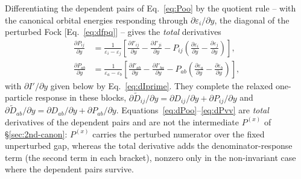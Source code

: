 \documentclass[12pt]{article}
\begin{document}
\noindent
Differentiating the dependent pairs of Eq.~\eqref{eq:Poo} by the quotient rule --
with the canonical orbital energies responding through
$\partial\varepsilon_i/\partial y$, the diagonal of the perturbed Fock
[Eq.~\eqref{eq:dfpq}] -- gives the {\em total} derivatives
\begin{align}
\frac{\partial P_{ij}}{\partial y}
&= \frac{1}{\varepsilon_i-\varepsilon_j}\left[
\frac{\partial I'_{ij}}{\partial y}-\frac{\partial I'_{ji}}{\partial y}
- P_{ij}\left(\frac{\partial\varepsilon_i}{\partial y}
             -\frac{\partial\varepsilon_j}{\partial y}\right)\right],
\label{eq:dPoo}\\
\frac{\partial P_{ab}}{\partial y}
&= \frac{1}{\varepsilon_a-\varepsilon_b}\left[
\frac{\partial I'_{ab}}{\partial y}-\frac{\partial I'_{ba}}{\partial y}
- P_{ab}\left(\frac{\partial\varepsilon_a}{\partial y}
             -\frac{\partial\varepsilon_b}{\partial y}\right)\right],
\label{eq:dPvv}
\end{align}
with $\partial I'/\partial y$ given below by Eq.~\eqref{eq:dIprime}.  They complete
the relaxed one-particle response in these blocks,
$\partial\tilde D_{ij}/\partial y=\partial D_{ij}/\partial y+\partial P_{ij}/\partial y$
and $\partial\tilde D_{ab}/\partial y=\partial D_{ab}/\partial y+\partial P_{ab}/\partial y$.
Equations~\eqref{eq:dPoo}--\eqref{eq:dPvv} are {\em total} derivatives of the
dependent pairs and are not the intermediate $P^{(x)}$ of \S\ref{sec:2nd-canon}:
$P^{(x)}$ carries the perturbed numerator over the fixed unperturbed gap, whereas
the total derivative adds the denominator-response term (the second term in each
bracket), nonzero only in the non-invariant case where the dependent pairs
survive.
\end{document}

